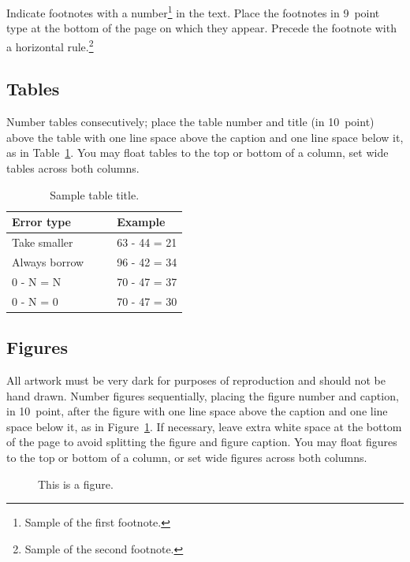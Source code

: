 \documentclass[10pt,letterpaper]{article}
\begin{document}
Indicate footnotes with a number\footnote{Sample of the first
  footnote.} in the text. Place the footnotes in 9~point type at the
bottom of the page on which they appear. Precede the footnote with a
horizontal rule.\footnote{Sample of the second footnote.}


\subsection{Tables}

Number tables consecutively; place the table number and title (in
10~point) above the table with one line space above the caption and
one line space below it, as in Table~\ref{sample-table}. You may float
tables to the top or bottom of a column, set wide tables across both
columns.

\begin{table}[!ht]
\begin{center} 
\caption{Sample table title.} 
\label{sample-table} 
\vskip 0.12in
\begin{tabular}{ll} 
\hline
Error type    &  Example \\
\hline
Take smaller        &   63 - 44 = 21 \\
Always borrow~~~~   &   96 - 42 = 34 \\
0 - N = N           &   70 - 47 = 37 \\
0 - N = 0           &   70 - 47 = 30 \\
\hline
\end{tabular} 
\end{center} 
\end{table}


\subsection{Figures}

All artwork must be very dark for purposes of reproduction and should
not be hand drawn. Number figures sequentially, placing the figure
number and caption, in 10~point, after the figure with one line space
above the caption and one line space below it, as in
Figure~\ref{sample-figure}. If necessary, leave extra white space at
the bottom of the page to avoid splitting the figure and figure
caption. You may float figures to the top or bottom of a column, or
set wide figures across both columns.

\begin{figure}[ht]
\begin{center}
\end{center}
\caption{This is a figure.} 
\label{sample-figure}
\end{figure}
\end{document}
